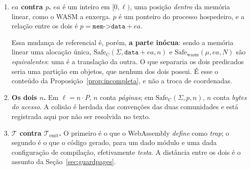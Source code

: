 \documentclass[11pt,a4paper]{article}
\theoremstyle{definition}
\newcommand{\Safe}{\mathrm{Safe}}
\newcommand{\wasm}{\mathrm{wasm}}
\newcommand{\code}[1]{\texttt{#1}}
\begin{document}
\begin{enumerate}[leftmargin=1.6em]
  \item \textbf{$ea$ contra $p$.} $ea$ é um inteiro em $[0,\ell)$, uma posição
        \emph{dentro} da memória linear, como o WASM a enxerga. $p$ é um ponteiro
        do processo hospedeiro, e a relação entre os dois é
        $p = \code{mem->data} + ea$.

        Essa mudança de referencial é, porém, \textbf{a parte inócua}: sendo a
        memória linear uma alocação única, $\Safe_{\mathrm{C}}(\Sigma,
        \code{data}+ea, n)$ e $\Safe_{\wasm}(\mu, ea, N)$ são \emph{equivalentes}:
        uma é a translação da outra. O que separaria os dois predicados seria
        uma partição em objetos, que nenhum dos dois possui. É esse o conteúdo da
        Proposição~\ref{prop:incompleta}, e não a troca de coordenadas.
  \item \textbf{Os dois $n$.} Em $\ell = n \cdot P$, $n$ conta \emph{páginas};
        em $\Safe_{\mathrm{C}}(\Sigma, p, n)$, $n$ conta \emph{bytes do acesso}.
        A colisão é herdada das convenções das duas comunidades e está registrada
        aqui por não ser resolvida no texto.
  \item \textbf{$\mathcal{T}$ contra $\mathcal{T}_{\mathrm{emit}}$.} O primeiro é
        o que o WebAssembly \emph{define} como \emph{trap}; o segundo é o que o
        código gerado, para um dado módulo e uma dada configuração de compilação,
        efetivamente \emph{testa}. A distância entre os dois é o assunto da
        Seção~\ref{sec:guardpages}.
\end{enumerate}
\end{document}
